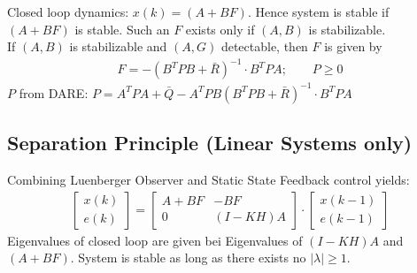 \documentclass[landscape,a4paper,8pt]{scrartcl}
\begin{document}
\begin{multicols*}{3}
Closed loop dynamics: $x(k) = (A+B F)$. Hence system is stable if $(A+B F)$ is stable. Such an $F$ exists only if $(A,B)$ is stabilizable. \\
If $(A,B)$ is stabilizable and $(A,G)$ detectable, then $F$ is given by
\begin{align*}
F = -(B^T P B + \bar{R})^{-1} \cdot B^T P A; \qquad P\geq 0
\end{align*}
$P$ from DARE: $P = A^T P A + \bar{Q} - A^T P B( B^T P B + \bar{R})^{-1} \cdot B^T P A$



\subsection{Separation Principle (Linear Systems only)}
Combining Luenberger Observer and Static State Feedback control yields:
\begin{align*}
\begin{bmatrix}
x(k) \\ e(k) 
\end{bmatrix}
= 
\begin{bmatrix}
A + BF & - B F \\ 0 & (I-KH) A
\end{bmatrix}
\cdot
\begin{bmatrix}
x(k-1) \\ e(k-1)
\end{bmatrix}
\end{align*}
Eigenvalues of closed loop are given bei Eigenvalues of $(I-KH) A$ and $(A + BF)$. System is stable as long as there exists no $|\lambda| \geq 1$. \\




\end{multicols*}
\end{document}
